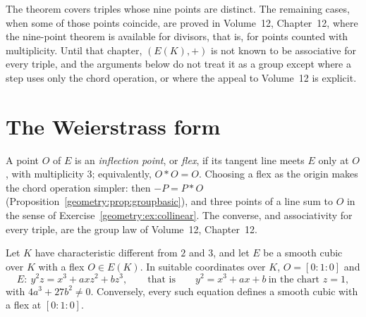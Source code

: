 \begin{remark}
The theorem covers triples whose nine points are distinct. The remaining cases, when some of those points coincide, are proved in Volume~12, Chapter~12, where the nine-point theorem is available for divisors, that is, for points counted with multiplicity. Until that chapter, $(E(K),+)$ is not known to be associative for every triple, and the arguments below do not treat it as a group except where a step uses only the chord operation, or where the appeal to Volume~12 is explicit.
\end{remark}

\section{The Weierstrass form}\label{geometry:sec:weierstrass}

A point $O$ of $E$ is an \emph{inflection point}, or \emph{flex}, if its tangent line meets $E$ only at $O$, with multiplicity $3$; equivalently, $O*O=O$.
Choosing a flex as the origin makes the chord operation simpler: then $-P=P*O$ (Proposition~\ref{geometry:prop:groupbasic}), and three points of a line sum to $O$ in the sense of Exercise~\ref{geometry:ex:collinear}. The converse, and associativity for every triple, are the group law of Volume~12, Chapter~12.

\begin{proposition}\label{geometry:prop:weierstrass}
Let $K$ have characteristic different from $2$ and $3$, and let $E$ be a smooth cubic over $K$ with a flex $O\in E(K)$. In suitable coordinates over
$K$, $O=[0:1:0]$ and
\[
E:\ y^2z=x^3+axz^2+bz^3,\qquad\text{that is}\qquad y^2=x^3+ax+b\ \text{in the chart }z=1,
\]
with $4a^3+27b^2\ne0$. Conversely, every such equation defines a smooth cubic with a flex at $[0:1:0]$.
\end{proposition}

